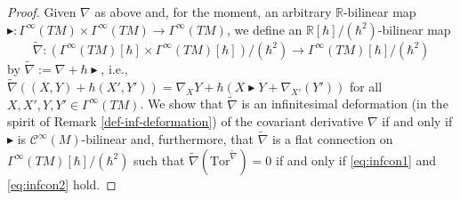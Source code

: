 \documentclass[10pt]{article}
\theoremstyle{definition}
\newcommand{\bt}{\blacktriangleright}
\begin{document}
\begin{proof}
Given $\nabla$ as above and, for the moment, an arbitrary $\mathbb{R}$-bilinear map $\bt\colon\Gamma^\infty(TM)\times\Gamma^\infty(TM)\to\Gamma^\infty(TM)$, we define an $\mathbb{R}[\hbar]/(\hbar^2)$-bilinear map
$$
\tilde{\nabla}\colon(\Gamma^\infty(TM)[\hbar]\times\Gamma^\infty(TM)[\hbar])/(\hbar^2)\to\Gamma^\infty(TM)[\hbar]/(\hbar^2)
$$
by $\tilde{\nabla}:=\nabla+\hbar\bt$, i.e., $\tilde{\nabla}((X,Y)+\hbar(X',Y'))=\nabla_{X}Y+\hbar(X\bt Y+\nabla_{X'}(Y'))$ for all $X,X',Y,Y'\in\Gamma^\infty(TM)$. We show that $\tilde{\nabla}$ is an infinitesimal deformation (in the spirit of Remark \ref{def-inf-deformation}) of the covariant derivative $\nabla$ if and only if $\bt$ is $\mathscr{C}^\infty(M)$-bilinear and, furthermore, that $\tilde{\nabla}$ is a flat connection on $\Gamma^\infty(TM)[\hbar]/(\hbar^2)$ such that $\tilde{\nabla}(\mathrm{Tor}^{\tilde{\nabla}})=0$ if and only if \eqref{eq:infcon1} and \eqref{eq:infcon2} hold.


\end{proof}
\end{document}
